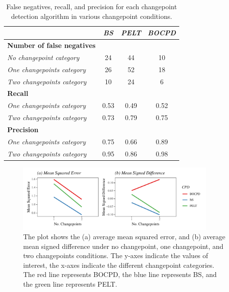\documentclass[]{interact}
\theoremstyle{plain}%
\theoremstyle{definition}
\theoremstyle{remark}
\begin{document}
{	\begin{table}[H]
		\captionsetup{justification=raggedright}
		\centering
		\renewcommand{\arraystretch}{1.2} %
		\small
		\begin{tabular}{lccc}
			\hline
			& \textit{BS} & \textit{PELT} & \textit{BOCPD} \\ \hline
			\textbf{Number of false negatives} &             &               &                \\
			\textit{No changepoint category}   & 24          & 44            & 10             \\
			\textit{One changepoints category} & 26          & 52            & 18             \\
			\textit{Two changepoints category} & 10          & 24            & 6              \\
			\textbf{Recall}                    &             &               &                \\
			\textit{One changepoints category} & 0.53        & 0.49          & 0.52           \\
			\textit{Two changepoints category} & 0.73        & 0.79          & 0.75           \\
			\textbf{Precision}                 &             &               &                \\
			\textit{One changepoints category} & 0.75        & 0.66          & 0.89           \\
			\textit{Two changepoints category} & 0.95        & 0.86          & 0.98           \\ \hline
		\end{tabular}
	\caption{False negatives, recall, and precision for each changepoint detection algorithm in various changepoint conditions.}
	\label{FN_TPR_PPV}
	\end{table}

    \begin{figure}[H]
    	\captionsetup{justification=raggedright}
    	\renewcommand{\figurename}{Figure}
    	\centering
    	\includegraphics[width=10cm]{MSEMSD}
    	\caption{\fontsize{8}{10}\selectfont The plot shows the (a) average mean squared error, and (b) average mean signed difference under no changepoint, one changepoint, and two changepoints conditions. The y-axes indicate the values of interest, the x-axes indicate the different changepoint categories. The red line represents BOCPD, the blue line represents BS, and the green line represents PELT.}
    	\label{Figure 4}
    \end{figure}

}
\end{document}
